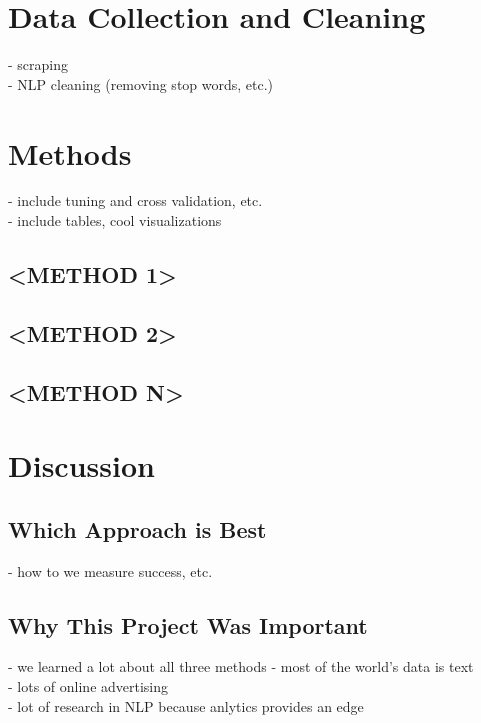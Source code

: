 \documentclass[11pt]{article}
\begin{document}
\section{Data Collection and Cleaning}
- scraping \\ 
- NLP cleaning (removing stop words, etc.) \\

\section{Methods}
- include tuning and cross validation, etc. \\
- include tables, cool visualizations \\

\subsection{<METHOD 1>}

\subsection{<METHOD 2>}

\subsection{<METHOD N>}



\section{Discussion}
\subsection{Which Approach is Best}
- how to we measure success, etc.

\subsection{Why This Project Was Important}
- we learned a lot about all three methods
- most of the world's data is text \\
- lots of online advertising \\
- lot of research in NLP because anlytics provides an edge \\
\end{document}

